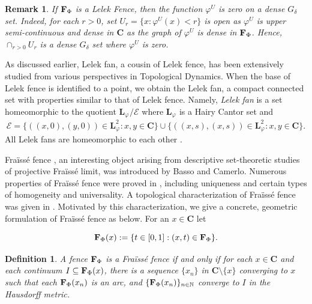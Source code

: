 \documentclass[11pt]{amsart}
\newtheorem{definition}[theorem]{Definition}
\newtheorem{remark}[theorem]{Remark}
\newcommand{\N}{\mathbb{N}}  %
\newcommand{\cantor}{\mathbf C}
\newcommand{\fence}{{\bf F}_{\Phi}{}}
\newcommand{\ffence}[2]{{\mathbf L}_{{#1}_{#2}}}
\begin{document}
\begin{remark}
 If  $\fence$ is a Lelek Fence,  then the  function $\varphi^U$ is zero on a dense $G_\delta$ set. Indeed, for each $r >0$, set $U_r = \{x: \varphi^U  (x) < r \}$ is open as $\varphi^U$ is upper semi-continuous and dense in $\cantor$ as the graph of $\varphi^U$ is dense in $\fence$. Hence, $\cap_{r > 0} U_r$ is a dense $G_{\delta}$ set where  $\varphi^U$ is zero.
\end{remark}

As discussed earlier, Lelek fan, a cousin of Lelek fence, has been extensively studied from various perspectives in Topological Dynamics. 
When the base of Lelek fence is identified to a point, we obtain the Lelek fan, a compact connected set with properties similar to that of Lelek fence. Namely, \emph{Lelek fan} is a set homeomorphic to the quotient $\ffence{\varphi}{}/\mathcal{E}$ where $\ffence{\varphi}{}$ is a Hairy Cantor set and 
\[ \mathcal{E} = \{ ((x,0), (y,0)) \in \ffence{\varphi}{}^2: x, y \in \cantor \} \cup \{ ((x,s),(x,s)) \in \ffence{\varphi}{}^2 : x, y \in \cantor \}.\]
All Lelek fans are homeomorphic to each other \cite{oversteegenOneLF}. 

Fra\"iss\'e fence \cite{BassoCamerlo}, an interesting object arising from descriptive set-theoretic studies of projective Fra\"iss\'e limit, was introduced by Basso and Camerlo. Numerous properties of Fra\"iss\'e fence were proved in \cite{BassoCamerlo}, including uniqueness and certain types of homogeneity and universality. 
A topological characterization of Fra\"iss\'e fence  was given in \cite[Theorem 5.3]{BassoCamerlo}. Motivated by this characterization, we give a concrete, geometric formulation of Fra\"iss\'e fence as below. For an $x\in \cantor$ let

\[
\fence (x) := \{t \in [0,1]: (x,t) \in \fence\}.
\]

\begin{definition}\label{def:fraisse}
    A fence $\fence$ is a Fra\"iss\'e fence if and only if 
 for each $x \in \cantor$ and each continuum $I \subseteq \fence (x)$, there is a sequence $\{x_n\}$ in $\cantor \setminus \{x\}$ converging to $x$ such that each $\fence (x_n)$ is an arc, and $\{\fence (x_n)\}_{n \in \N}$ converge to $I$ in the Hausdorff metric. %
\end{definition}
\end{document}
